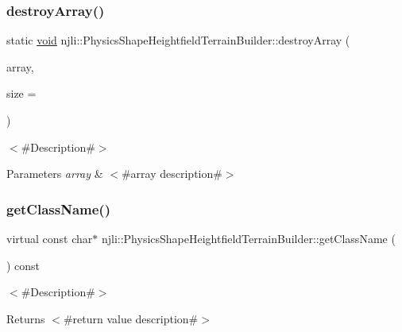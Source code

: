 \subsubsection{\texorpdfstring{destroy\+Array()}{destroyArray()}}
{\footnotesize\ttfamily static \mbox{\hyperlink{_thread_8h_af1e856da2e658414cb2456cb6f7ebc66}{void}} njli\+::\+Physics\+Shape\+Heightfield\+Terrain\+Builder\+::destroy\+Array (\begin{DoxyParamCaption}\item[{\mbox{\hyperlink{classnjli_1_1_physics_shape_heightfield_terrain_builder}{Physics\+Shape\+Heightfield\+Terrain\+Builder}} $\ast$$\ast$}]{array,  }\item[{const \mbox{\hyperlink{_util_8h_a10e94b422ef0c20dcdec20d31a1f5049}{u32}}}]{size = {} }\end{DoxyParamCaption})\hspace{0.3cm}{\ttfamily [static]}}

$<$\#\+Description\#$>$


\begin{DoxyParams}{Parameters}
{\em array} & $<$\#array description\#$>$ \\
\hline
\end{DoxyParams}
\mbox{\label{classnjli_1_1_physics_shape_heightfield_terrain_builder_ac0cd372ed65e9f98804721ebbc5ebab2}} 
\subsubsection{\texorpdfstring{get\+Class\+Name()}{getClassName()}}
{\footnotesize\ttfamily virtual const char$\ast$ njli\+::\+Physics\+Shape\+Heightfield\+Terrain\+Builder\+::get\+Class\+Name (\begin{DoxyParamCaption}{ }\end{DoxyParamCaption}) const\hspace{0.3cm}{\ttfamily [virtual]}}

$<$\#\+Description\#$>$

\begin{DoxyReturn}{Returns}
$<$\#return value description\#$>$ 
\end{DoxyReturn}


